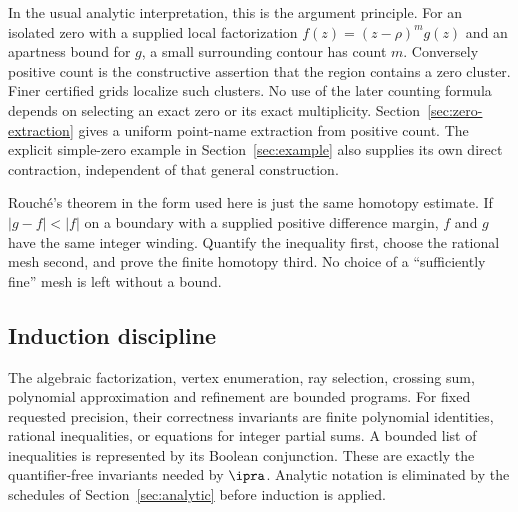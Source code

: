 In the usual analytic interpretation, this is the argument principle.
For an isolated zero with a supplied local factorization
$f(z)=(z-\rho)^m g(z)$ and an apartness bound for $g$, a small
surrounding contour has count $m$. Conversely positive count is the
constructive assertion that the region contains a zero cluster. Finer
certified grids localize such clusters. No use of the later counting
formula depends on selecting an exact zero or its exact multiplicity.
Section~\ref{sec:zero-extraction} gives a uniform point-name extraction
from positive count. The explicit simple-zero example in
Section~\ref{sec:example} also supplies its own direct contraction,
independent of that general construction.

Rouch\'e's theorem in the form used here is just the same homotopy
estimate. If $|g-f|<|f|$ on a boundary with a supplied positive
difference margin, $f$ and $g$ have the same integer winding. Quantify
the inequality first, choose the rational mesh second, and prove the
finite homotopy third. No choice of a ``sufficiently fine'' mesh is
left without a bound.

\subsection{Induction discipline}
The algebraic factorization, vertex enumeration, ray selection, crossing
sum, polynomial approximation and refinement are bounded programs.
For fixed requested precision, their correctness invariants are finite
polynomial identities, rational inequalities, or equations for integer
partial sums. A bounded list of inequalities is represented by its
Boolean conjunction. These are exactly the quantifier-free invariants
needed by $\ipra$. Analytic notation is eliminated by the schedules of
Section~\ref{sec:analytic} before induction is applied.
